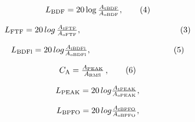 \documentclass{article}
\begin{document}
\[
$$
L_{\mathrm{B D F}}=2 0 \operatorname{l o g} \frac{A_{\mathrm{t B D F}}} {A_{\mathrm{o B D F}}}, \tag{4}
$$
\]

\[
$$
L_{\mathrm{F T F}}=2 0 \, l o g \, {\frac{A_{t \mathrm{F T F}}} {A_{\mathrm{o F T F}}}}, \qquad\qquad\qquad\qquad\qquad\qquad( 3 )
$$
\]

\[
$$
L_{\mathrm{B D F l}}=2 0 \, l o g {\frac{A_{\mathrm{i B D F l}}} {A_{\mathrm{o B D F l}}}}, \qquad\qquad\qquad\qquad\qquad( 5 )
$$
\]

\[
$$
C_{\mathrm{A}}=\frac{A_{\mathrm{P E A K}}} {A_{\mathrm{R M S}}} \,, \tag{6}
$$
\]

\[
$$
L_{\mathrm{P E A K}}=2 0 \, l o g {\frac{A_{\mathrm{t P E A K}}} {A_{\mathrm{o P E A K}}}},
$$
\]

\[
$$
L_{\mathrm{B P F O}}=2 0 \, l o g {\frac{A_{t \mathrm{B P F O}}} {A_{\mathrm{o B P F O}}}},
$$
\]
\end{document}
